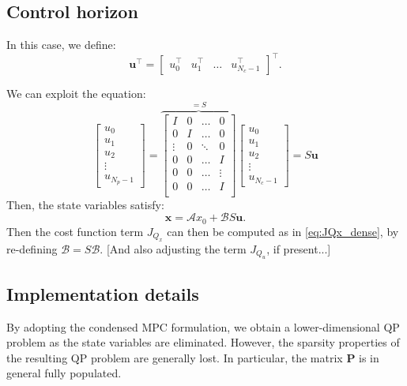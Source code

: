\documentclass[a4paper,12pt,fleqn]{article}
\newcommand{\PQP}{\mathbf{P}}
\newcommand{\varxvec}{\mathbf{x}}
\newcommand{\varuvec}{\mathbf{u}}
\newcommand{\Np}{{N_p}}
\newcommand{\Nc}{{N_c}}
\begin{document}
\subsection{Control horizon}
In this case, we define:
\begin{equation}
\varuvec^\top = \begin{bmatrix} u_0^\top &u_1^\top &\dots& u_{\Nc-1}^\top\end{bmatrix}^\top.
\end{equation}

We can exploit the equation:
\begin{equation}
 \begin{bmatrix}
  u_0 \\ u_1 \\ u_2 \\ \vdots\\ u_{\Np-1}
 \end{bmatrix} = 
 \overbrace{
 \begin{bmatrix}
 I      &0      &\dots  & 0\\
 0      &I      &\dots  &0\\
 \vdots &0      &\ddots & 0\\
 0      &0      &\dots  &I\\
 0      &0      &\dots  &\vdots\\
 0      &0      &\dots  &I\\
\end{bmatrix}
}^{=S}
 \begin{bmatrix}
  u_0 \\ u_1 \\ u_2 \\ \vdots\\ u_{\Nc-1}
 \end{bmatrix} 
 = S \varuvec
\end{equation}
Then, the state variables satisfy:
\begin{equation}
 \varxvec = \mathcal{A}x_0 + \mathcal{B}S \varuvec.
\end{equation}
Then the cost function term $J_{Q_x}$ can then be computed as in \eqref{eq:JQx_dense}, by re-defining $\mathcal{B} = S\mathcal{B}$.
[And also adjusting the term $J_{Q_u}$, if present...]

\subsection{Implementation details}
By adopting the condensed MPC formulation, we obtain a lower-dimensional QP problem as the state variables are eliminated. 
However, the sparsity properties of the resulting QP problem are generally lost. In particular, the matrix $\PQP$ is in general 
fully populated. 
\end{document}
